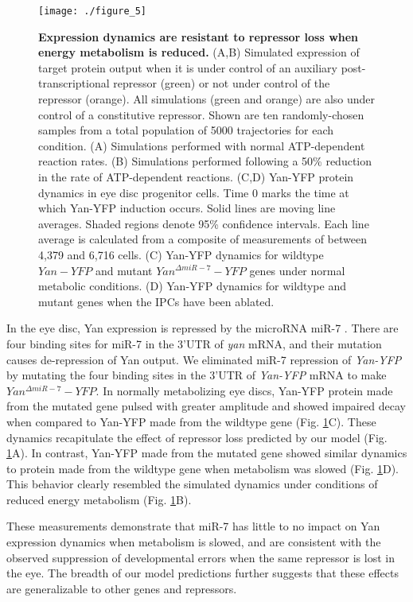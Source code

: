\begin{figure}[h!]
\centering
\texttt{[image: ./figure\_5]}
\caption[Expression dynamics are resistant to repressor loss when energy metabolism is reduced.]{\textbf{Expression dynamics are resistant to repressor loss when energy metabolism is reduced.} (A,B) Simulated expression of target protein output when it is under control of an auxiliary post-transcriptional repressor (green) or not under control of the repressor (orange). All simulations (green and orange) are also under control of a constitutive repressor. Shown are ten randomly-chosen samples from a total population of 5000 trajectories for each condition. (A) Simulations performed with normal ATP-dependent reaction rates. (B) Simulations performed following a 50\% reduction in the rate of ATP-dependent reactions. (C,D) Yan-YFP protein dynamics in eye disc progenitor cells. Time 0 marks the time at which Yan-YFP induction occurs. Solid lines are moving line averages. Shaded regions denote 95\% confidence intervals. Each line average is calculated from a composite of measurements of between 4,379 and 6,716 cells. (C) Yan-YFP dynamics for wildtype $Yan-YFP$ and mutant $Yan^{\Delta miR-7}-YFP$ genes under normal metabolic conditions. (D) Yan-YFP dynamics for wildtype and mutant genes when the IPCs have been ablated.}
\label{fig:metabolism:fig5}
\end{figure}

In the eye disc, Yan expression is repressed by the microRNA miR-7 \cite{Li2005}. There are four binding sites for miR-7 in the 3'UTR of \textit{yan} mRNA, and their mutation causes de-repression of Yan output. We eliminated miR-7 repression of \textit{Yan-YFP} by mutating the four binding sites in the 3'UTR of \textit{Yan-YFP} mRNA to make $Yan^{\Delta miR-7}-YFP$. In normally metabolizing eye discs, Yan-YFP protein made from the mutated gene pulsed with greater amplitude and showed impaired decay when compared to Yan-YFP made from the wildtype gene (Fig. \ref{fig:metabolism:fig5}C). These dynamics recapitulate the effect of repressor loss predicted by our model (Fig. \ref{fig:metabolism:fig5}A). In contrast, Yan-YFP made from the mutated gene showed similar dynamics to protein made from the wildtype gene when metabolism was slowed (Fig. \ref{fig:metabolism:fig5}D). This behavior clearly resembled the simulated dynamics under conditions of reduced energy metabolism (Fig. \ref{fig:metabolism:fig5}B).

These measurements demonstrate that miR-7 has little to no impact on Yan expression dynamics when metabolism is slowed, and are consistent with the observed suppression of developmental errors when the same repressor is lost in the eye. The breadth of our model predictions further suggests that these effects are generalizable to other genes and repressors.

